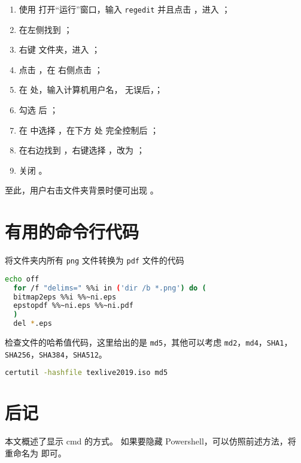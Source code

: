 \documentclass{ctexart}
\begin{document}
\begin{enumerate}
  \item 使用  打开“运行”窗口，输入 \texttt{regedit} 并且点击 ，进入 ；
  \item 在左侧找到 ；
  \item 右键  文件夹，进入 ；
  \item 点击 ，在  右侧点击 ；
  \item 在  处，输入计算机用户名， 无误后，；
  \item 勾选  后 ；
  \item 在  中选择 ，在下方  处  完全控制后 ；
  \item 在右边找到 ，右键选择 ，改为 ；
  \item 关闭 。
\end{enumerate}
至此，用户右击文件夹背景时便可出现 。

\section{有用的命令行代码}

将文件夹内所有 \texttt{png} 文件转换为 \texttt{pdf} 文件的代码

\begin{lstlisting}[language = bash]
  echo off
  for /f "delims=" %%i in ('dir /b *.png') do (
  bitmap2eps %%i %%~ni.eps
  epstopdf %%~ni.eps %%~ni.pdf
  )
  del *.eps
\end{lstlisting}

检查文件的哈希值代码，这里给出的是 \verb|md5|，其他可以考虑 \verb|md2|，\verb|md4|，\verb|SHA1|，\verb|SHA256|，\verb|SHA384|，\verb|SHA512|。

\begin{lstlisting}[language = bash]
  certutil -hashfile texlive2019.iso md5
\end{lstlisting}

\section{后记}

本文概述了显示 \textsf{cmd} 的方式。
如果要隐藏 \textsf{Powershell}，可以仿照前述方法，将  重命名为  即可。
\end{document}
